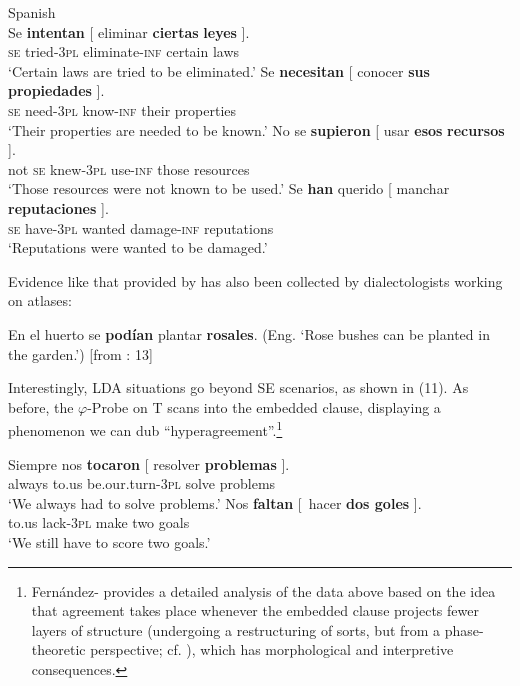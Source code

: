 \documentclass[output=paper]{langsci/langscibook}
\begin{document}
\ea%
    Spanish\label{ex:gallego:9}\\
    \ea
    \gll Se  \textbf{intentan}  [ eliminar        \textbf{ciertas}  \textbf{leyes} ].        \\
         \textsc{se} tried\textsc{{}-3pl} {}  eliminate-\textsc{inf}  certain   laws\\
    \glt ‘Certain laws are tried to be eliminated.’  
    \ex
    \gll Se  \textbf{necesitan}  [ conocer     \textbf{sus}    \textbf{propiedades} ].         \\
            \textsc{se}  need\textsc{{}-3pl} {}  know-\textsc{inf}   their  properties\\
    \glt    ‘Their properties are needed to be known.’
    \ex
    \gll No se   \textbf{supieron}  [ usar        \textbf{esos}    \textbf{recursos} ].        \\
            not \textsc{se} knew\textsc{{}-3pl} {}   use-\textsc{inf}   those   resources\\
    \glt    ‘Those resources were not known to be used.’
    \ex
    \gll  Se   \textbf{han}           querido [ manchar        \textbf{reputaciones} ].     \\
            \textsc{se} have\textsc{{}-3pl}  wanted {}   damage-\textsc{inf}   reputations\\
    \glt     ‘Reputations were wanted to be damaged.’
    \z
\z

Evidence like that provided by \citet{RAE-ASALE2009} has also been collected by dialectologists working on atlases:

\ea%
En el huerto se \textbf{podían} plantar \textbf{rosales}.  (Eng. ‘Rose bushes can be planted in the garden.’) [from \citealt{Benito2010}: 13] \\
\z

Interestingly, LDA situations go beyond SE scenarios, as shown in (11). As before, the $\varphi $-Probe on T scans into the embedded clause, displaying a phenomenon we can dub “hyperagreement”.\footnote{Fernández-\citet{Serrano2016} provides a detailed analysis of the data above based on the idea that agreement takes place whenever the embedded clause projects fewer layers of structure (undergoing a restructuring of sorts, but from a phase-theoretic perspective; cf. \citealt{Gallego2009}), which has morphological and interpretive consequences.} 

\ea%
    \label{ex:gallego:11}
    \ea
    \gll Siempre   nos    \textbf{tocaron}              [ resolver  \textbf{problemas} ].\\
         always    to.us  be.our.turn-\textsc{3pl}  solve       problems\\
    \glt ‘We always had to solve problems.’
    \ex
    \gll Nos   \textbf{faltan}    [~hacer  \textbf{dos  goles} ].\\
         to.us  lack-\textsc{3pl}   make two goals\\
    \glt ‘We still have to score two goals.’
    \z
\z    
\end{document}
